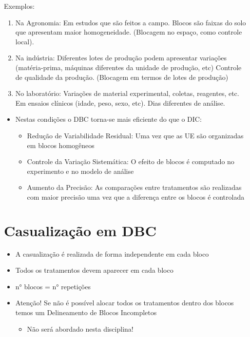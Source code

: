 \documentclass[
]{book}
\providecommand{\tightlist}{%
  \setlength{\itemsep}{0pt}\setlength{\parskip}{0pt}}
\begin{document}
Exemplos:

\begin{enumerate}
\def\labelenumi{\arabic{enumi}.}
\item
  Na Agronomia:
  Em estudos que são feitos a campo. Blocos são faixas do solo que apresentam maior homogeneidade.
  (Blocagem no espaço, como controle local).
\item
  Na indústria:
  Diferentes lotes de produção podem apresentar variações (matéria-prima, máquinas diferentes da unidade de produção, etc)
  Controle de qualidade da produção.
  (Blocagem em termos de lotes de produção)
\item
  No laboratório:
  Variações de material experimental, coletas, reagentes, etc.
  Em ensaios clínicos (idade, peso, sexo, etc).
  Dias diferentes de análise.
\end{enumerate}

\begin{itemize}
\tightlist
\item
  Nestas condições o DBC torna-se mais eficiente do que o DIC:

  \begin{itemize}
  \tightlist
  \item
    Redução de Variabilidade Residual: Uma vez que as UE são organizadas em blocos homogêneos
  \item
    Controle da Variação Sistemática: O efeito de blocos é computado no experimento e no modelo de análise
  \item
    Aumento da Precisão: As comparações entre tratamentos são realizadas com maior precisão uma vez que a diferença entre os blocos é controlada
  \end{itemize}
\end{itemize}

\section{Casualização em DBC}\label{casualizauxe7uxe3o-em-dbc}

\begin{itemize}
\item
  A casualização é realizada de forma independente em cada bloco
\item
  Todos os tratamentos devem aparecer em cada bloco
\item
  n° blocos = n° repetições
\item
  Atenção! Se não é possível alocar todos os tratamentos dentro dos blocos temos um Delineamento de Blocos Incompletos

  \begin{itemize}
  \tightlist
  \item
    Não será abordado nesta disciplina!
  \end{itemize}
\end{itemize}
\end{document}
